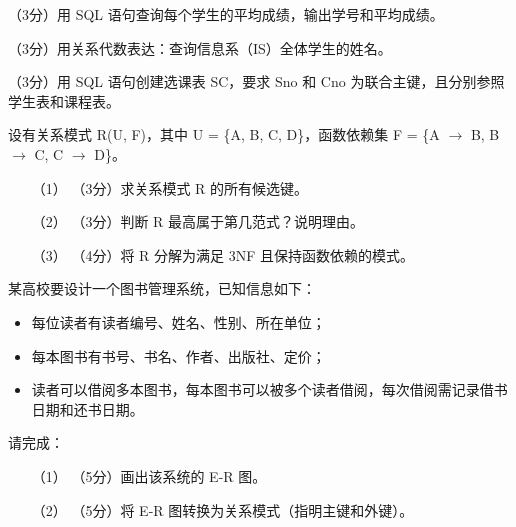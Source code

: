 \documentclass[a4paper,11pt]{article}
\begin{document}
\q （3分）用 SQL 语句查询每个学生的平均成绩，输出学号和平均成绩。

\anslines{1cm}

\q （3分）用关系代数表达：查询信息系（IS）全体学生的姓名。

\anslines{1.2cm}

\q （3分）用 SQL 语句创建选课表 SC，要求 Sno 和 Cno 为联合主键，且分别参照学生表和课程表。

\anslines{1.5cm}


\q 设有关系模式 R(U, F)，其中 U = \{A, B, C, D\}，函数依赖集 F = \{A $\rightarrow$ B, B $\rightarrow$ C, C $\rightarrow$ D\}。

\begin{enumerate}[leftmargin=2em, itemsep=3pt]
  \item[（1）] （3分）求关系模式 R 的所有候选键。
  \item[（2）] （3分）判断 R 最高属于第几范式？说明理由。
  \item[（3）] （4分）将 R 分解为满足 3NF 且保持函数依赖的模式。
\end{enumerate}

\anslines{3cm}


\q 某高校要设计一个图书管理系统，已知信息如下：
\begin{itemize}
  \item 每位读者有读者编号、姓名、性别、所在单位；
  \item 每本图书有书号、书名、作者、出版社、定价；
  \item 读者可以借阅多本图书，每本图书可以被多个读者借阅，每次借阅需记录借书日期和还书日期。
\end{itemize}

请完成：
\begin{enumerate}[leftmargin=2em, itemsep=3pt]
  \item[（1）] （5分）画出该系统的 E-R 图。
  \item[（2）] （5分）将 E-R 图转换为关系模式（指明主键和外键）。
\end{enumerate}

\anslines{4cm}

\end{document}
